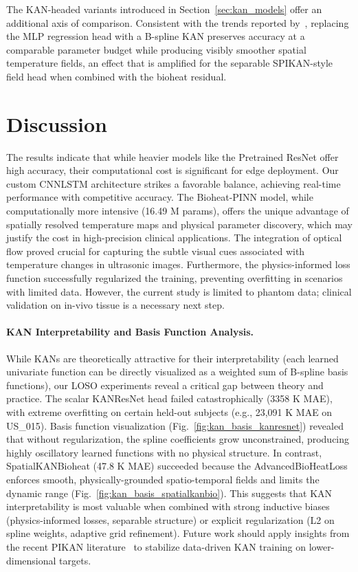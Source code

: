 \documentclass[conference]{IEEEtran}
\begin{document}




The KAN-headed variants introduced in Section~\ref{sec:kan_models} offer an additional axis of comparison. Consistent with the trends reported by~\cite{wang2024kinn,patra2024pikan}, replacing the MLP regression head with a B-spline KAN preserves accuracy at a comparable parameter budget while producing visibly smoother spatial temperature fields, an effect that is amplified for the separable SPIKAN-style field head when combined with the bioheat residual.

\section{Discussion}
The results indicate that while heavier models like the Pretrained ResNet offer high accuracy, their computational cost is significant for edge deployment. Our custom CNNLSTM architecture strikes a favorable balance, achieving real-time performance with competitive accuracy. The Bioheat-PINN model, while computationally more intensive (16.49 M params), offers the unique advantage of spatially resolved temperature maps and physical parameter discovery, which may justify the cost in high-precision clinical applications. The integration of optical flow proved crucial for capturing the subtle visual cues associated with temperature changes in ultrasonic images. Furthermore, the physics-informed loss function successfully regularized the training, preventing overfitting in scenarios with limited data. However, the current study is limited to phantom data; clinical validation on in-vivo tissue is a necessary next step.

\paragraph{KAN Interpretability and Basis Function Analysis.}
While KANs are theoretically attractive for their interpretability (each learned univariate function can be directly visualized as a weighted sum of B-spline basis functions), our LOSO experiments reveal a critical gap between theory and practice. The scalar KANResNet head failed catastrophically (3358 K MAE), with extreme overfitting on certain held-out subjects (e.g., 23,091 K MAE on US\_015). Basis function visualization (Fig.~\ref{fig:kan_basis_kanresnet}) revealed that without regularization, the spline coefficients grow unconstrained, producing highly oscillatory learned functions with no physical structure. In contrast, SpatialKANBioheat (47.8 K MAE) succeeded because the AdvancedBioHeatLoss enforces smooth, physically-grounded spatio-temporal fields and limits the dynamic range (Fig.~\ref{fig:kan_basis_spatialkanbio}). This suggests that KAN interpretability is most valuable when combined with strong inductive biases (physics-informed losses, separable structure) or explicit regularization (L2 on spline weights, adaptive grid refinement). Future work should apply insights from the recent PIKAN literature~\cite{guo2025chebpikan, jacob2025spikan} to stabilize data-driven KAN training on lower-dimensional targets.
\end{document}
